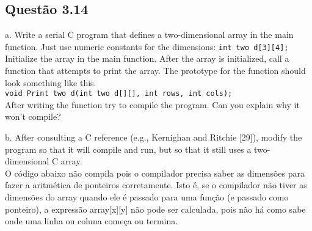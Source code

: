 

\subsection{Questão 3.14}

a. Write a serial C program that defines a two-dimensional array in the main function. Just use numeric constants for the dimensions: \texttt{int two d[3][4];}\\
 Initialize the array in the main function. After the array is initialized, call a function that attempts to print the array. The prototype for the function should look something like this. \\
\texttt{void Print two d(int two d[][], int rows, int cols);}\\
After writing the function try to compile the program. Can you explain
why it won’t compile?

b. After consulting a C reference (e.g., Kernighan and Ritchie [29]), modify the program so that it will compile and run, but so that it still uses a two-dimensional C array. \\

O código abaixo não compila pois o compilador precisa saber as dimensões para fazer a aritmética de ponteiros corretamente. Isto é, se o compilador não tiver as dimensões do array quando ele é passado para uma função (e passado como ponteiro), a expressão array[x][y] não pode ser calculada, pois não há como sabe onde uma linha ou coluna começa ou termina.






